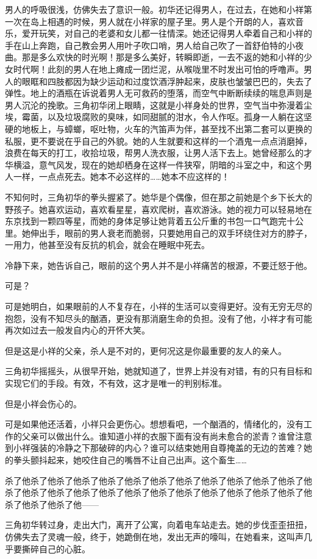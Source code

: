 \documentclass{article}
\begin{document}
男人的呼吸很浅，仿佛失去了意识一般。初华还记得男人，在过去，在她和小祥第一次在岛上相遇的时候，男人就在小祥家的屋子里。男人是个开朗的人，喜欢音乐，爱开玩笑，对自己的老婆和女儿都一往情深。她还记得男人牵着自己和小祥的手在山上奔跑，自己教会男人用叶子吹口哨，男人给自己吹了一首舒伯特的小夜曲。那是多么欢快的时光啊！那是多么美好，转瞬即逝，一去不返的她和小祥的少女时代啊！此刻的男人在地上瘫成一团烂泥，从喉咙里不时发出可怕的呼噜声。男人的眼眶和四肢都因为缺少运动和过度饮酒浮肿起来，皮肤也皱皱巴巴的，失去了弹性。地上的酒瓶在诉说着男人无可救药的堕落，而空气中断断续续的喘息声则是男人沉沦的挽歌。三角初华闭上眼睛，这就是小祥身处的世界，空气当中弥漫着尘埃，霉菌，以及垃圾腐败的臭味，如同甜腻的泔水，令人作呕。孤身一人躺在这坚硬的地板上，与蟑螂，呕吐物，火车的汽笛声为伴，甚至找不出第二套可以更换的私服，更不要说在乎自己的外貌。她的人生就要和这样的一个酒鬼一点点消磨掉，浪费在每天的打工，收拾垃圾，帮男人洗衣服，让男人活下去上。她曾经那么的才华横溢，意气风发，现在的她却栖身在这样一件狭窄，阴暗的斗室之中，和这个男人一样，一点点死去。她本不必这样的……她本不应这样的！



不知何时，三角初华的拳头握紧了。她华是个偶像，但在那之前她是个乡下长大的野孩子。她喜欢运动，喜欢看星星，喜欢爬树，喜欢游泳。她的视力可以轻易地在东京找到一颗四等星，而她的身体足够让她背着五公斤重的书包一口气跑完十公里。她伸出手，眼前的男人衰老而脆弱，只要她用自己的双手环绕住对方的脖子，一用力，他甚至没有反抗的机会，就会在睡眠中死去。



冷静下来，她告诉自己，眼前的这个男人并不是小祥痛苦的根源，不要迁怒于他。



可是？



可是她明白，如果眼前的人不复存在，小祥的生活可以变得更好。没有无穷无尽的抱怨，没有不知尽头的酗酒，更没有那消磨生命的负担。没有了他，小祥才有可能再次如过去一般发自内心的开怀大笑。



但是这是小祥的父亲，杀人是不对的，更何况这是你最重要的友人的亲人。



三角初华摇摇头，从很早开始，她就知道了，世界上并没有对错，有的只有目标和实现它们的手段。有效，不有效，这才是唯一的判别标准。



但是小祥会伤心的。



可是如果他还活着，小祥只会更伤心。想想看吧，一个酗酒的，情绪化的，没有工作的父亲可以做出什么。谁知道小祥的衣服下面有没有尚未愈合的淤青？谁曾注意到小祥强装的冷静之下那破碎的内心？谁可以结束她用自尊掩盖的无边的苦难？她的拳头颤抖起来，她咬住自己的嘴唇不让自己出声。这个畜生……



杀了他杀了他杀了他杀了他杀了他杀了他杀了他杀了他杀了他杀了他杀了他杀了他杀了他杀了他杀了他杀了他杀了他杀了他杀了他杀了他杀了他杀了他杀了他杀了他杀了他杀了他杀了他——



三角初华转过身，走出大门，离开了公寓，向着电车站走去。她的步伐歪歪扭扭，仿佛失去了灵魂一般，终于，她跪倒在地，发出无声的嚎叫，在她看来，这叫声几乎要撕碎自己的心脏。
\end{document}
